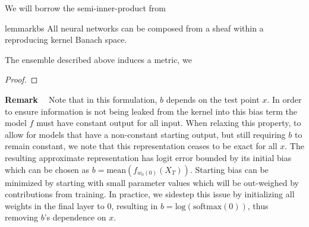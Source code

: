 We will borrow the semi-inner-product from ~\cite{rkbs-paper}

\begin{restatable}{lemma}{rkbs}
All neural networks can be composed from a sheaf within a reproducing
kernel Banach space. 
\end{restatable}


The ensemble described above induces a metric, we
\begin{proof}

\end{proof}

\textbf{Remark ~} Note that in this formulation, $b$ depends on the test point $x$.
In order to ensure information is not being leaked from the kernel into this bias term the model $f$ must have constant output for all input. 
When relaxing this property, to allow for models that have a non-constant starting output, but still requiring $b$ to remain constant, we note that this representation ceases to be exact for all $x$.
The resulting approximate representation has logit error bounded by its initial bias which can be chosen as $b = \text{mean}(f_{w_0(0)}(X_T))$.
Starting bias can be minimized by starting with small parameter values which will be out-weighed by contributions from training.
In practice, we sidestep this issue by initializing all weights in the final layer to $0$, resulting in $b=\text{log}(\text{softmax}(0))$, thus removing $b$'s dependence on $x$.

